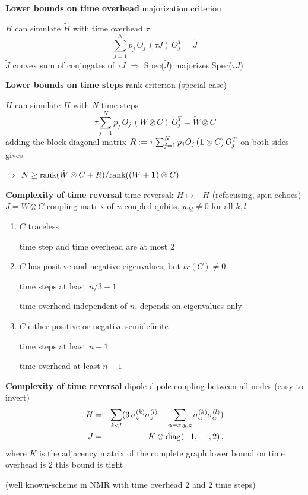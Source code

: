 \documentclass[portrait]{seminar}
\newcommand{\onemat}{{\bf 1}}
\begin{document}
\begin{slide}
{\large {\bf Lower bounds on time overhead}}
\vfill 
{\blue majorization criterion}

$H$ can simulate $\tilde{H}$ with time overhead $\tau$
\[
\sum_{j=1}^N p_j\, O_j \,(\tau J)\, O_j^T =
\tilde{J}
\]
$\tilde{J}$ convex sum of conjugates of $\tau J$
$\Longrightarrow$
{\red Spec($\tilde{J}$) majorizes Spec($\tau J$)}
\vfill
\end{slide}

\begin{slide}
{\large {\bf Lower bounds on time steps}} 
\vfill
{\blue rank criterion} (special case)

$H$ can simulate $\tilde{H}$ with $N$ time steps
\[
\tau\sum_{j=1}^N 
p_j\, O_j 
\,(W\otimes C)\,
O_j^T =
\tilde{W}\otimes C
\]
adding the block diagonal matrix $R:=\tau\sum_{j=1}^N p_j O_j
\,(\onemat\otimes C)\,O_j^T$ on both sides gives

$\Longrightarrow$ {\red $N \ge \mbox{rank}(\tilde{W}\otimes C + R)/
\mbox{rank}((W+\onemat)\otimes C)$}

\vfill
\end{slide}

\begin{slide}
{\large {\bf Complexity of time reversal}}
\vfill
time reversal: $H \mapsto -H$ (refocusing, spin echoes)
\vfill
$J=W\otimes C$ coupling matrix of $n$ coupled qubits, $w_{kl}\neq 0$ for 
all $k,l$
\vfill
\begin{enumerate}
\item $C$ traceless

time step and time overhead are at most $2$
\item $C$ has positive and negative eigenvalues, but $tr(C)\neq 0$

time steps at least $n/3-1$

time overhead independent of $n$, depends on eigenvalues only

\item $C$ either positive or negative semidefinite

time steps at least $n-1$

time overhead at least $n-1$
\end{enumerate}
\vfill

\end{slide}



\begin{slide}
{\large {\bf Complexity of time reversal}}
\vfill
{\red dipole-dipole coupling} between all nodes (easy to invert)
\begin{eqnarray*}
H & = & \sum_{k<l} (3\,\sigma_z^{(k)}\sigma_z^{(l)} - 
\sum_{\alpha=x,y,z} \sigma_\alpha^{(k)}\sigma_\alpha^{(l)}) \\
J & = & K \otimes {\rm diag}(-1,-1,2)\,,
\end{eqnarray*}
where $K$ is the adjacency matrix of the complete graph 
\vfill 
lower bound on time overhead is $2$ 
\vfill 
this bound is tight 

(well known-scheme in NMR with time overhead $2$ and $2$ time steps) 
\vfill
\end{slide}
\end{document}
